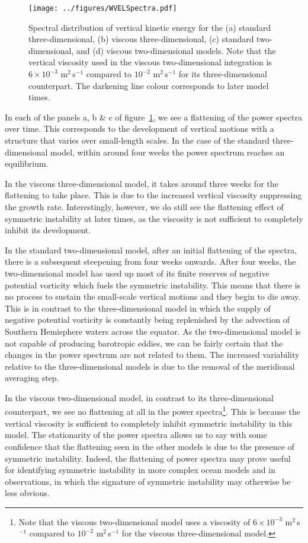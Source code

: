 \begin{figure} 
    \centering
    \texttt{[image: ../figures/WVELSpectra.pdf]}
    \caption{Spectral distribution of vertical kinetic energy for the (a) standard three-dimensional, (b) viscous three-dimensional, (c) standard two-dimensional, and (d) viscous two-dimensional models. Note that the vertical viscosity used in the viscous two-dimensional integration is $6 \times 10^{-3}$ m$^2\,$s$^{-1}$ compared to $10^{-2}$ m$^2\,$s$^{-1}$ for its three-dimensional counterpart. The darkening line colour corresponds to later model times.}
    \label{fig:SpectralEnergyDensity}
\end{figure}

In each of the panels a, b \& c of figure~\ref{fig:SpectralEnergyDensity}, we see a flattening of the power spectra over time. This corresponds to the development of vertical motions with a structure that varies over small-length scales. In the case of the standard three-dimensional model, within around four weeks the power spectrum reaches an equilibrium.

In the viscous three-dimensional model, it takes around three weeks for the flattening to take place. This is due to the increased vertical viscosity suppressing the growth rate. Interestingly, however, we do still see the flattening effect of symmetric instability at later times, as the viscosity is not sufficient to completely inhibit its development.

In the standard two-dimensional model, after an initial flattening of the spectra, there is a subsequent steepening from four weeks onwards. After four weeks, the two-dimensional model has used up most of its finite reserves of negative potential vorticity which fuels the symmetric instability. This means that there is no process to sustain the small-scale vertical motions and they begin to die away. This is in contrast to the three-dimensional model in which the supply of negative potential vorticity is constantly being replenished by the advection of Southern Hemisphere waters across the equator. As the two-dimensional model is not capable of producing barotropic eddies, we can be fairly certain that the changes in the power spectrum are not related to them. The increased variability relative to the three-dimensional models is due to the removal of the meridional averaging step.

In the viscous two-dimensional model, in contrast to its three-dimensional counterpart, we see no flattening at all in the power spectra\footnote{Note that the viscous two-dimensional model uses a viscosity of $6 \times 10^{-3}$ m$^2$\,s$^{-1}$ compared to $10^{-2}$ m$^2$\,s$^{-1}$ for the viscous three-dimensional model.}. This is because the vertical viscosity is sufficient to completely inhibit symmetric instability in this model. The stationarity of the power spectra allows us to say with some confidence that the flattening seen in the other models is due to the presence of symmetric instability. Indeed, the flattening of power spectra may prove useful for identifying symmetric instability in more complex ocean models and in observations, in which the signature of symmetric instability may otherwise be less obvious.

